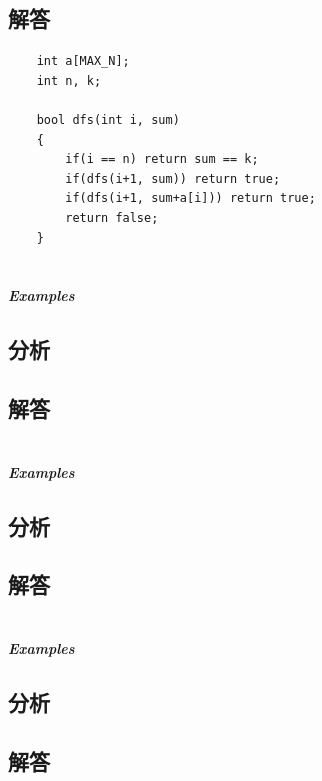 \documentclass[UTF8,a4paper,12pt]{ctexbook}
\begin{document}
	\subsection{解答}
		\begin{lstlisting}
	int a[MAX_N];
	int n, k;
	
	bool dfs(int i, sum)
	{
		if(i == n) return sum == k;
		if(dfs(i+1, sum)) return true;
		if(dfs(i+1, sum+a[i])) return true;
		return false;
	}
		\end{lstlisting}
	
\section{}
	
	\subparagraph{Examples}
	
	\subsection{分析}
	
	\subsection{解答}
	
\section{}
	
	\subparagraph{Examples}
	
	\subsection{分析}
	
	\subsection{解答}
	
\section{}
	
	\subparagraph{Examples}
	
	\subsection{分析}
	
	\subsection{解答}
	
\end{document}
